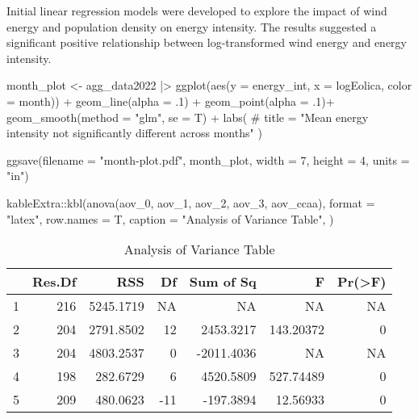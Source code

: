 \documentclass[
]{report}
\newenvironment{Shaded}{\begin{snugshade}}{\end{snugshade}}
\newcommand{\AttributeTok}[1]{\textcolor[rgb]{0.40,0.45,0.13}{#1}}
\newcommand{\CommentTok}[1]{\textcolor[rgb]{0.37,0.37,0.37}{#1}}
\newcommand{\DecValTok}[1]{\textcolor[rgb]{0.68,0.00,0.00}{#1}}
\newcommand{\FunctionTok}[1]{\textcolor[rgb]{0.28,0.35,0.67}{#1}}
\newcommand{\NormalTok}[1]{\textcolor[rgb]{0.00,0.23,0.31}{#1}}
\newcommand{\OtherTok}[1]{\textcolor[rgb]{0.00,0.23,0.31}{#1}}
\newcommand{\SpecialCharTok}[1]{\textcolor[rgb]{0.37,0.37,0.37}{#1}}
\newcommand{\StringTok}[1]{\textcolor[rgb]{0.13,0.47,0.30}{#1}}
\begin{document}
Initial linear regression models were developed to explore the impact of
wind energy and population density on energy intensity. The results
suggested a significant positive relationship between log-transformed
wind energy and energy intensity.

\begin{Shaded}
\begin{Highlighting}[]
\NormalTok{month\_plot }\OtherTok{\textless{}{-}}\NormalTok{ agg\_data2022 }\SpecialCharTok{|\textgreater{}} 
  \FunctionTok{ggplot}\NormalTok{(}\FunctionTok{aes}\NormalTok{(}\AttributeTok{y =}\NormalTok{ energy\_int, }\AttributeTok{x =}\NormalTok{ logEolica, }\AttributeTok{color =}\NormalTok{ month)) }\SpecialCharTok{+} 
  \FunctionTok{geom\_line}\NormalTok{(}\AttributeTok{alpha =}\NormalTok{ .}\DecValTok{1}\NormalTok{) }\SpecialCharTok{+} \FunctionTok{geom\_point}\NormalTok{(}\AttributeTok{alpha =}\NormalTok{ .}\DecValTok{1}\NormalTok{)}\SpecialCharTok{+} 
  \FunctionTok{geom\_smooth}\NormalTok{(}\AttributeTok{method =} \StringTok{"glm"}\NormalTok{, }\AttributeTok{se =}\NormalTok{ T) }\SpecialCharTok{+}
  \FunctionTok{labs}\NormalTok{(}
  \CommentTok{\#  title = "Mean energy intensity not significantly different across months"}
\NormalTok{  ) }

\FunctionTok{ggsave}\NormalTok{(}\AttributeTok{filename =} \StringTok{"month{-}plot.pdf"}\NormalTok{, month\_plot, }\AttributeTok{width =} \DecValTok{7}\NormalTok{, }\AttributeTok{height =} \DecValTok{4}\NormalTok{, }\AttributeTok{units =} \StringTok{"in"}\NormalTok{)}
\end{Highlighting}
\end{Shaded}

\begin{Shaded}
\begin{Highlighting}[]
\NormalTok{kableExtra}\SpecialCharTok{::}\FunctionTok{kbl}\NormalTok{(}\FunctionTok{anova}\NormalTok{(aov\_0, aov\_1, aov\_2, aov\_3, aov\_ccaa),}
                \AttributeTok{format =} \StringTok{"latex"}\NormalTok{, }\AttributeTok{row.names =}\NormalTok{ T, }\AttributeTok{caption =} \StringTok{"Analysis of Variance Table"}\NormalTok{,}
\NormalTok{        )}
\end{Highlighting}
\end{Shaded}

\begin{table}

\caption{Analysis of Variance Table}
\centering
\begin{tabular}[t]{l|r|r|r|r|r|r}
\hline
  & Res.Df & RSS & Df & Sum of Sq & F & Pr(>F)\\
\hline
1 & 216 & 5245.1719 & NA & NA & NA & NA\\
\hline
2 & 204 & 2791.8502 & 12 & 2453.3217 & 143.20372 & 0\\
\hline
3 & 204 & 4803.2537 & 0 & -2011.4036 & NA & NA\\
\hline
4 & 198 & 282.6729 & 6 & 4520.5809 & 527.74489 & 0\\
\hline
5 & 209 & 480.0623 & -11 & -197.3894 & 12.56933 & 0\\
\hline
\end{tabular}
\end{table}
\end{document}
